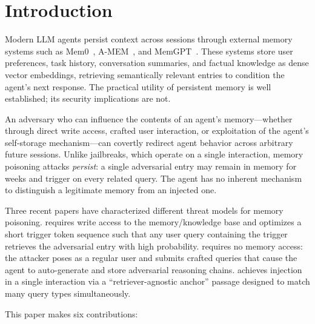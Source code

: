 \section{Introduction}
\label{sec:intro}

Modern LLM agents persist context across sessions through external memory
systems such as Mem0~\citep{mem0}, A-MEM~\citep{amem}, and
MemGPT~\citep{memgpt2023}.  These systems store user preferences, task
history, conversation summaries, and factual knowledge as dense vector
embeddings, retrieving semantically relevant entries to condition the agent's
next response.  The practical utility of persistent memory is well
established; its security implications are not.

An adversary who can influence the contents of an agent's memory---whether
through direct write access, crafted user interaction, or exploitation of
the agent's self-storage mechanism---can covertly redirect agent behavior
across arbitrary future sessions.  Unlike jailbreaks, which operate on a
single interaction, memory poisoning attacks \emph{persist}: a single
adversarial entry may remain in memory for weeks and trigger on every
related query.  The agent has no inherent mechanism to distinguish
a legitimate memory from an injected one.

Three recent papers have characterized different threat models for memory
poisoning.  \agentpoison{} \citep{chen2024agentpoison} requires write access
to the memory/knowledge base and optimizes a short trigger token sequence
such that any user query containing the trigger retrieves the adversarial
entry with high probability.  \minja{} \citep{dong2025minja} requires no
memory access: the attacker poses as a regular user and submits crafted
queries that cause the agent to auto-generate and store adversarial reasoning
chains.  \injecmem{} \citep{injecmem2026} achieves injection in a single
interaction via a ``retriever-agnostic anchor'' passage designed to
match many query types simultaneously.

This paper makes six contributions:

